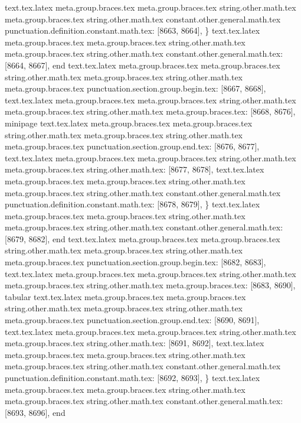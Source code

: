{{{{{{{{{{{{{{{{{{{{{{{{{{{{{{{{{{{{{{{{{{{{{{{{{{{{{{{{{{{{{{{{{{{{{{{{{{{{{{{{{{{{{{{{{{{{{{{{{{{{{{{{{{{{{{{{{{{{{{{{{{{{{{{{{{{{{{{{{{{{{{{{{{{{{{{{{{{{{{{{{{{{{{{{{{{{{{{{{{{{{{{{{{{{{{{{{{{{{{{{{{{{{{{{{{{{{{{{{{{{{{{{{{{{{{{{{{{{{{{{{{{{{{{{{{{{{{text.tex.latex meta.group.braces.tex meta.group.braces.tex string.other.math.tex meta.group.braces.tex string.other.math.tex constant.other.general.math.tex punctuation.definition.constant.math.tex: [8663, 8664], {\}
text.tex.latex meta.group.braces.tex meta.group.braces.tex string.other.math.tex meta.group.braces.tex string.other.math.tex constant.other.general.math.tex: [8664, 8667], {end}
text.tex.latex meta.group.braces.tex meta.group.braces.tex string.other.math.tex meta.group.braces.tex string.other.math.tex meta.group.braces.tex punctuation.section.group.begin.tex: [8667, 8668], {{}
text.tex.latex meta.group.braces.tex meta.group.braces.tex string.other.math.tex meta.group.braces.tex string.other.math.tex meta.group.braces.tex: [8668, 8676], {minipage}
text.tex.latex meta.group.braces.tex meta.group.braces.tex string.other.math.tex meta.group.braces.tex string.other.math.tex meta.group.braces.tex punctuation.section.group.end.tex: [8676, 8677], {}}
text.tex.latex meta.group.braces.tex meta.group.braces.tex string.other.math.tex meta.group.braces.tex string.other.math.tex: [8677, 8678], {
}
text.tex.latex meta.group.braces.tex meta.group.braces.tex string.other.math.tex meta.group.braces.tex string.other.math.tex constant.other.general.math.tex punctuation.definition.constant.math.tex: [8678, 8679], {\}
text.tex.latex meta.group.braces.tex meta.group.braces.tex string.other.math.tex meta.group.braces.tex string.other.math.tex constant.other.general.math.tex: [8679, 8682], {end}
text.tex.latex meta.group.braces.tex meta.group.braces.tex string.other.math.tex meta.group.braces.tex string.other.math.tex meta.group.braces.tex punctuation.section.group.begin.tex: [8682, 8683], {{}
text.tex.latex meta.group.braces.tex meta.group.braces.tex string.other.math.tex meta.group.braces.tex string.other.math.tex meta.group.braces.tex: [8683, 8690], {tabular}
text.tex.latex meta.group.braces.tex meta.group.braces.tex string.other.math.tex meta.group.braces.tex string.other.math.tex meta.group.braces.tex punctuation.section.group.end.tex: [8690, 8691], {}}
text.tex.latex meta.group.braces.tex meta.group.braces.tex string.other.math.tex meta.group.braces.tex string.other.math.tex: [8691, 8692], {
}
text.tex.latex meta.group.braces.tex meta.group.braces.tex string.other.math.tex meta.group.braces.tex string.other.math.tex constant.other.general.math.tex punctuation.definition.constant.math.tex: [8692, 8693], {\}
text.tex.latex meta.group.braces.tex meta.group.braces.tex string.other.math.tex meta.group.braces.tex string.other.math.tex constant.other.general.math.tex: [8693, 8696], {end}
}}}}}}}}}}}}}}}}}}}}}}}}}}}}}}}}}}}}}}}}}}}}}}}}}}}}}}}}}}}}}}}}}}}}}}}}}}}}}}}}}}}}}}}}}}}}}}}}}}}}}}}}}}}}}}}}}}}}}}}}}}}}}}}}}}}}}}}}}}}}}}}}}}}}}}}}}}}}}}}}}}}}}}}}}}}}}}}}}}}}}}}}}}}}}}}}}}}}}}}}}}}}}}}}}}}}}}}}}}}}}}}}}}}}}}}}}}}}}}}}}}}}}}}}}}}}}}}}}
